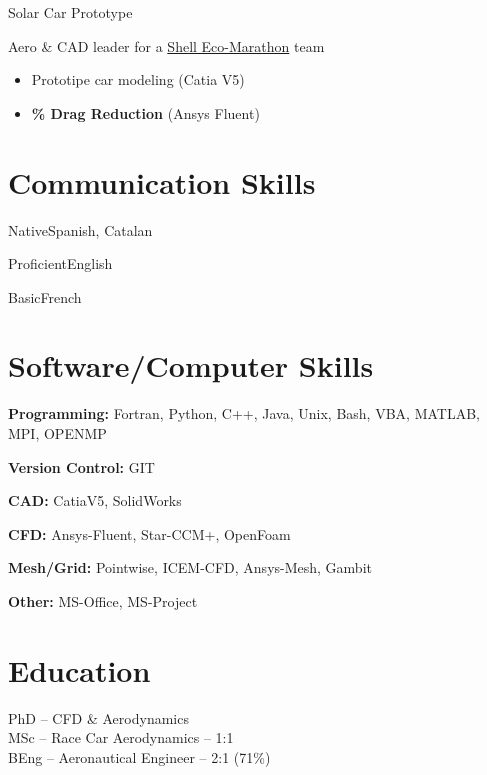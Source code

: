 \documentclass[fontsize=10pt]{tccv}
\begin{document}
\begin{eventlist}
     {Solar Car Prototype}

Aero \& CAD leader for a
\href{http://www.shell.com/global/environment-society/ecomarathon.html}{Shell
Eco-Marathon} team
\begin{itemize}
\itemsep -2pt
	\item Prototipe car modeling (Catia V5)
	\item \textbf{\% Drag Reduction} (Ansys Fluent)
\end{itemize}
\end{eventlist}

\vspace{-20pt}
\section{Communication Skills}
\begin{factlist}
\item{Native}{Spanish, Catalan}
\item{Proficient}{English}
\item{Basic}{French}
\end{factlist}

\vspace{-20pt}
\section{Software/Computer Skills}
\begin{factlist}
\item{\textbf{Programming:}}
     {Fortran, Python, C++, Java, Unix, Bash, VBA, MATLAB, MPI, OPENMP}
\item{\textbf{Version Control:}}
     {GIT}
\item{\textbf{CAD:}}
     {CatiaV5, SolidWorks}
\item{\textbf{CFD:}}
     {Ansys-Fluent, Star-CCM+, OpenFoam}
\item{\textbf{Mesh/Grid:}}
     {Pointwise, ICEM-CFD, Ansys-Mesh, Gambit}
\item{\textbf{Other:}}
     {MS-Office, MS-Project}
\end{factlist}


\vspace{-20pt}
\section{Education}
\begin{eventlist}
     	{\normalsize{PhD -- CFD \& Aerodynamics}} \\

\vspace{-8pt}
     	{\normalsize{MSc -- Race Car Aerodynamics -- 1:1}} \\

\vspace{-8pt}
	{\normalsize{BEng -- Aeronautical Engineer -- 2:1 (71\%)}}
\end{eventlist}
\end{document}

